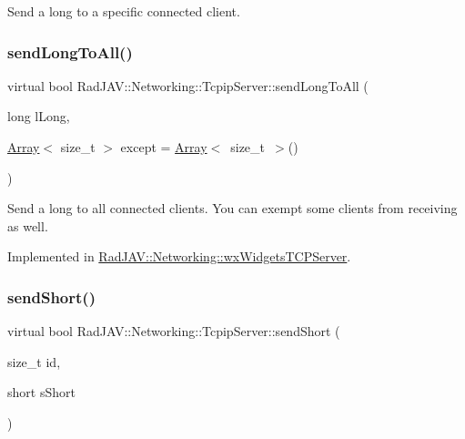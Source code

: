 Send a long to a specific connected client. \mbox{\label{class_rad_j_a_v_1_1_networking_1_1_tcpip_server_a54e65701f913a800034b8eca4a16e5eb}} 
\subsubsection{\texorpdfstring{send\+Long\+To\+All()}{sendLongToAll()}}
{\footnotesize\ttfamily virtual bool Rad\+J\+A\+V\+::\+Networking\+::\+Tcpip\+Server\+::send\+Long\+To\+All (\begin{DoxyParamCaption}\item[{long}]{l\+Long,  }\item[{\mbox{\hyperlink{class_rad_j_a_v_1_1_array}{Array}}$<$ size\+\_\+t $>$}]{except = {\ttfamily \mbox{\hyperlink{class_rad_j_a_v_1_1_array}{Array}}$<$~size\+\_\+t~$>$()} }\end{DoxyParamCaption})\hspace{0.3cm}{\ttfamily [pure virtual]}}

Send a long to all connected clients. You can exempt some clients from receiving as well. 

Implemented in \mbox{\hyperlink{class_rad_j_a_v_1_1_networking_1_1wx_widgets_t_c_p_server_a5f1f5d1adfdb67912afa5ef527766e1a}{Rad\+J\+A\+V\+::\+Networking\+::wx\+Widgets\+T\+C\+P\+Server}}.

\mbox{\label{class_rad_j_a_v_1_1_networking_1_1_tcpip_server_a5c68d2ad228feeaa3a9f8c8c049193e0}} 
\subsubsection{\texorpdfstring{send\+Short()}{sendShort()}}
{\footnotesize\ttfamily virtual bool Rad\+J\+A\+V\+::\+Networking\+::\+Tcpip\+Server\+::send\+Short (\begin{DoxyParamCaption}\item[{size\+\_\+t}]{id,  }\item[{short}]{s\+Short }\end{DoxyParamCaption})\hspace{0.3cm}{\ttfamily [pure virtual]}}

